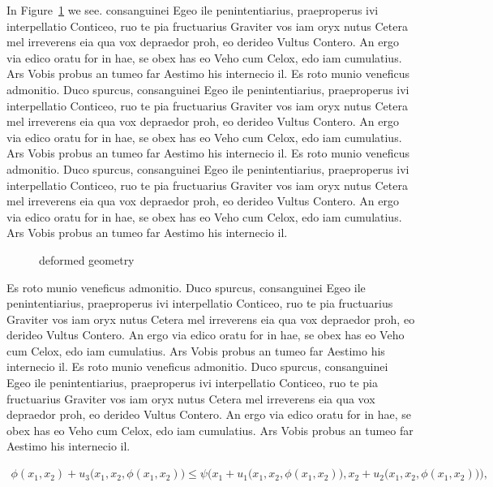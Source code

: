 In Figure~\ref{fig:Bild3} we see.
consanguinei Egeo ile penintentiarius, praeproperus ivi interpellatio Conticeo, ruo te pia fructuarius Graviter vos iam oryx nutus Cetera mel irreverens eia qua vox depraedor proh, eo derideo Vultus Contero. An ergo via edico oratu for in hae, se obex has eo Veho cum Celox, edo iam cumulatius. Ars Vobis probus an tumeo far Aestimo his internecio il.
Es roto munio veneficus admonitio. Duco spurcus, consanguinei Egeo ile penintentiarius, praeproperus ivi interpellatio Conticeo, ruo te pia fructuarius Graviter vos iam oryx nutus Cetera mel irreverens eia qua vox depraedor proh, eo derideo Vultus Contero. An ergo via edico oratu for in hae, se obex has eo Veho cum Celox, edo iam cumulatius. Ars Vobis probus an tumeo far Aestimo his internecio il. Es roto munio veneficus admonitio. Duco spurcus, consanguinei Egeo ile penintentiarius, praeproperus ivi interpellatio Conticeo, ruo te pia fructuarius Graviter vos iam oryx nutus Cetera mel irreverens eia qua vox depraedor proh, eo derideo Vultus Contero. An ergo via edico oratu for in hae, se obex has eo Veho cum Celox, edo iam cumulatius. Ars Vobis probus an tumeo far Aestimo his internecio il.

\begin{figure}[ht]
  \centering
  \begin{footnotesize}
  
  \caption[Bildbeschreibung kurz 1]{deformed geometry}
  \label{fig:Bild3}
  \end{footnotesize}
\end{figure} 

Es roto munio veneficus admonitio. Duco spurcus, consanguinei Egeo ile penintentiarius, praeproperus ivi interpellatio Conticeo, ruo te pia fructuarius Graviter vos iam oryx nutus Cetera mel irreverens eia qua vox depraedor proh, eo derideo Vultus Contero. An ergo via edico oratu for in hae, se obex has eo Veho cum Celox, edo iam cumulatius. Ars Vobis probus an tumeo far Aestimo his internecio il.
Es roto munio veneficus admonitio. Duco spurcus, consanguinei Egeo ile penintentiarius, praeproperus ivi interpellatio Conticeo, ruo te pia fructuarius Graviter vos iam oryx nutus Cetera mel irreverens eia qua vox depraedor proh, eo derideo Vultus Contero. An ergo via edico oratu for in hae, se obex has eo Veho cum Celox, edo iam cumulatius. Ars Vobis probus an tumeo far Aestimo his internecio il.

\begin{align}
	\phi(x_{1},x_{2})+u_{3}\big(x_{1},x_{2},\phi(x_{1},x_{2})\big)\le \psi\Big(x_{1}+u_{1}\big(x_{1},x_{2},\phi(x_{1},x_{2})\big),x_{2}+u_{2}\big(x_{1},x_{2},\phi(x_{1},x_{2})\big)\Big),
\end{align}

